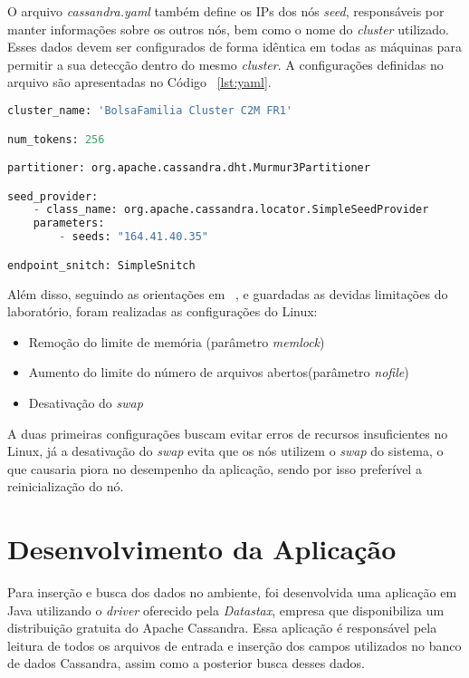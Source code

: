 O arquivo \emph{cassandra.yaml} também define os IPs dos nós \emph{seed}, responsáveis por manter informações sobre os outros nós, bem como o nome do \emph{cluster} utilizado. Esses dados devem ser configurados de forma idêntica em todas as máquinas para permitir a sua detecção dentro do mesmo \emph{cluster}. A configurações definidas no arquivo são apresentadas no Código ~\ref{lst:yaml}.

\begin{lstlisting}[caption={Configuração cassandra.yaml},label={lst:yaml},language=python]
cluster_name: 'BolsaFamilia Cluster C2M FR1'

num_tokens: 256

partitioner: org.apache.cassandra.dht.Murmur3Partitioner

seed_provider:
	- class_name: org.apache.cassandra.locator.SimpleSeedProvider
	parameters:
		- seeds: "164.41.40.35"

endpoint_snitch: SimpleSnitch

\end{lstlisting}

Além disso, seguindo as orientações em ~\cite{cassandrasettings}, e guardadas as devidas limitações do laboratório, foram realizadas as configurações do Linux:
\begin{itemize}
	\item Remoção do limite de memória (parâmetro \emph{memlock})
	\item Aumento do limite do número de arquivos abertos(parâmetro \emph{nofile})
	\item Desativação do \emph{swap}
\end{itemize}

A duas primeiras configurações buscam evitar erros de recursos insuficientes no Linux, já a desativação do \emph{swap} evita que os nós utilizem o \emph{swap} do sistema, o que causaria piora no desempenho da aplicação, sendo por isso preferível a reinicialização do nó.

\section{Desenvolvimento da Aplicação}
Para inserção e busca dos dados no ambiente, foi desenvolvida uma aplicação em Java utilizando o \emph{driver} oferecido pela \emph{Datastax}, empresa que disponibiliza um distribuição gratuita do Apache Cassandra. Essa aplicação é responsável pela leitura de todos os arquivos de entrada e inserção dos campos utilizados no banco de dados Cassandra, assim como a posterior busca desses dados.

